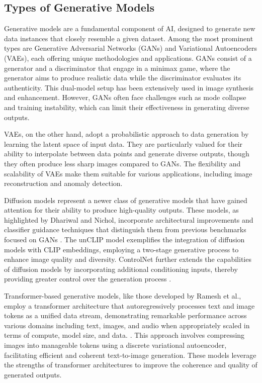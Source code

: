 \subsection{Types of Generative Models} \label{subsec:Types of Generative Models}



Generative models are a fundamental component of AI, designed to generate new data instances that closely resemble a given dataset. Among the most prominent types are Generative Adversarial Networks (GANs) and Variational Autoencoders (VAEs), each offering unique methodologies and applications. GANs consist of a generator and a discriminator that engage in a minimax game, where the generator aims to produce realistic data while the discriminator evaluates its authenticity. This dual-model setup has been extensively used in image synthesis and enhancement. However, GANs often face challenges such as mode collapse and training instability, which can limit their effectiveness in generating diverse outputs.



VAEs, on the other hand, adopt a probabilistic approach to data generation by learning the latent space of input data. They are particularly valued for their ability to interpolate between data points and generate diverse outputs, though they often produce less sharp images compared to GANs. The flexibility and scalability of VAEs make them suitable for various applications, including image reconstruction and anomaly detection.



Diffusion models represent a newer class of generative models that have gained attention for their ability to produce high-quality outputs. These models, as highlighted by Dhariwal and Nichol, incorporate architectural improvements and classifier guidance techniques that distinguish them from previous benchmarks focused on GANs \cite{dhariwal2021diffusion}. The unCLIP model exemplifies the integration of diffusion models with CLIP embeddings, employing a two-stage generative process to enhance image quality and diversity. ControlNet further extends the capabilities of diffusion models by incorporating additional conditioning inputs, thereby providing greater control over the generation process \cite{zhang2023adding}.



Transformer-based generative models, like those developed by Ramesh et al., employ a transformer architecture that autoregressively processes text and image tokens as a unified data stream, demonstrating remarkable performance across various domains including text, images, and audio when appropriately scaled in terms of compute, model size, and data. \cite{ramesh2021zero}. This approach involves compressing images into manageable tokens using a discrete variational autoencoder, facilitating efficient and coherent text-to-image generation. These models leverage the strengths of transformer architectures to improve the coherence and quality of generated outputs.



